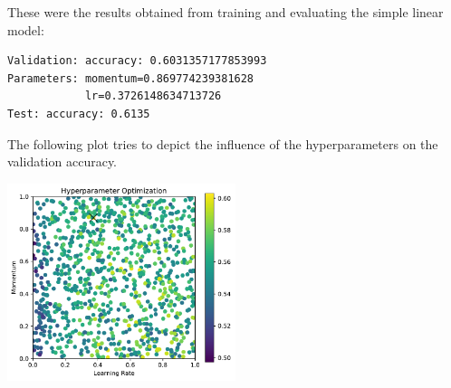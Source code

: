 \documentclass[sigconf,nonacm]{acmart}
\begin{document}
These were the results obtained from training and evaluating
the simple linear model:
\begin{lstlisting}[basicstyle=\ttfamily\small]
Validation: accuracy: 0.6031357177853993
Parameters: momentum=0.869774239381628
            lr=0.3726148634713726
Test: accuracy: 0.6135
\end{lstlisting}

The following plot tries to depict the influence of the hyperparameters
on the validation
accuracy.

\includegraphics[width=0.5\textwidth]{plot.pdf}



\end{document}
